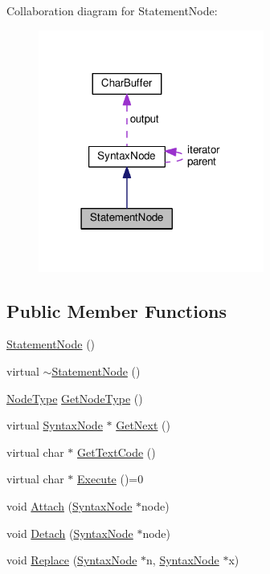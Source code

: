 Collaboration diagram for Statement\+Node\+:\nopagebreak
\begin{figure}[H]
\begin{center}
\leavevmode
\includegraphics[width=210pt]{classStatementNode__coll__graph}
\end{center}
\end{figure}
\subsection*{Public Member Functions}
\begin{DoxyCompactItemize}
\item 
\hyperlink{classStatementNode_a586026d6009a39d087792d621de86360}{Statement\+Node} ()
\item 
virtual \hyperlink{classStatementNode_a56eb628750a4bf9506eb24380876ae08}{$\sim$\+Statement\+Node} ()
\item 
\hyperlink{nodes_8h_acac9cbaeea226ed297804c012dc12b16}{Node\+Type} \hyperlink{classStatementNode_acde95037b93e7154cae2ce176b155bb3}{Get\+Node\+Type} ()
\item 
virtual \hyperlink{classSyntaxNode}{Syntax\+Node} $\ast$ \hyperlink{classStatementNode_a40b21f16cdb3b0e480b552007368f176}{Get\+Next} ()
\item 
virtual char $\ast$ \hyperlink{classStatementNode_a51c8ea87d60a7a28a4a823bfa7851942}{Get\+Text\+Code} ()
\item 
virtual char $\ast$ \hyperlink{classStatementNode_a721589622c930c010927b9a9c55b173e}{Execute} ()=0
\item 
void \hyperlink{classStatementNode_a9467acb7f6c6c6c0027637475e94fba2}{Attach} (\hyperlink{classSyntaxNode}{Syntax\+Node} $\ast$node)
\item 
void \hyperlink{classStatementNode_a68b34bad1cf1a5d9281cd055760e9fec}{Detach} (\hyperlink{classSyntaxNode}{Syntax\+Node} $\ast$node)
\item 
void \hyperlink{classStatementNode_a713efe48098d7f07c6014ca7ba337553}{Replace} (\hyperlink{classSyntaxNode}{Syntax\+Node} $\ast$n, \hyperlink{classSyntaxNode}{Syntax\+Node} $\ast$x)
\end{DoxyCompactItemize}
